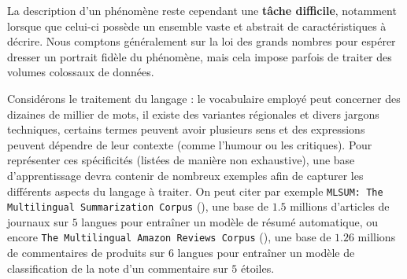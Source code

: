 			La description d'un phénomène reste cependant une \textbf{tâche difficile}, notamment lorsque que celui-ci possède un ensemble vaste et abstrait de caractéristiques à décrire.
			Nous comptons généralement sur la loi des grands nombres pour espérer dresser un portrait fidèle du phénomène, mais cela impose parfois de traiter des volumes colossaux de données.
			\begin{leftBarExamples}
				Considérons le traitement du langage : le vocabulaire employé peut concerner des dizaines de millier de mots, il existe des variantes régionales et divers jargons techniques, certains termes peuvent avoir plusieurs sens et des expressions peuvent dépendre de leur contexte (comme l'humour ou les critiques).
				Pour représenter ces spécificités (listées de manière non exhaustive), une base d'apprentissage devra contenir de nombreux exemples afin de capturer les différents aspects du langage à traiter.
				On peut citer par exemple \texttt{MLSUM: The Multilingual Summarization Corpus} (\cite{scialom-etal:2020:mlsum-multilingual-summarization}), une base de $1.5$ millions d'articles de journaux sur $5$ langues pour entraîner un modèle de résumé automatique, ou encore \texttt{The Multilingual Amazon Reviews Corpus} (\cite{keung-etal:2020:multilingual-amazon-reviewsa}), une base de $1.26$ millions de commentaires de produits sur $6$ langues pour entraîner un modèle de classification de la note d'un commentaire sur $5$ étoiles.
			\end{leftBarExamples}
			
